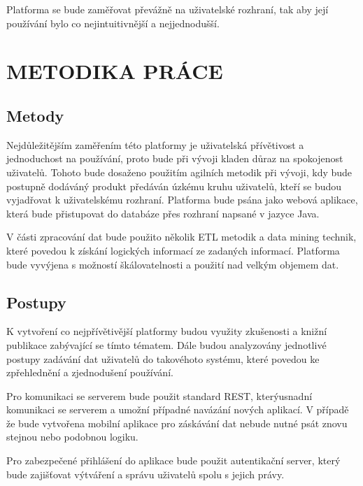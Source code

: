 Platforma se bude zaměřovat převážně na uživatelské rozhraní, tak aby její používání bylo co nejintuitivnější a nejjednodušší.

\chapter*{METODIKA PRÁCE}
\section*{Metody}
\par Nejdůležitějším zaměřením této platformy je uživatelská přívětivost a jednoduchost na používání, proto bude při vývoji kladen důraz na spokojenost uživatelů. Tohoto bude dosaženo použitím agilních metodik při vývoji, kdy bude postupně dodáváný produkt předáván úzkému kruhu uživatelů, kteří se budou vyjadřovat k uživatelskému rozhraní. Platforma bude psána jako webová aplikace, která bude přistupovat do databáze přes rozhraní napsané v jazyce Java.
\par V části zpracování dat bude použito několik ETL metodik a data mining technik, které povedou k získání logických informací ze zadaných informací. Platforma bude vyvýjena s možností 
škálovatelnosti a použití nad velkým objemem dat.

\section*{Postupy}
\par K vytvoření co nejpřívětivější platformy budou využity zkušenosti a knižní publikace zabývající se tímto tématem. Dále budou analyzovány jednotlivé postupy zadávání dat uživatelů do takovéhoto systému, které povedou ke zpřehlednění a zjednodušení používání.
\par Pro komunikaci se serverem bude použit standard REST, kterýusnadní komunikaci se serverem a umožní případné navázání nových aplikací. V případě že bude vytvořena mobilní aplikace pro záskávání dat nebude nutné psát znovu stejnou nebo podobnou logiku.
\par Pro zabezpečené přihlášení do aplikace bude použit autentikační server, který bude zajišťovat výtváření a správu uživatelů spolu s jejich právy.
